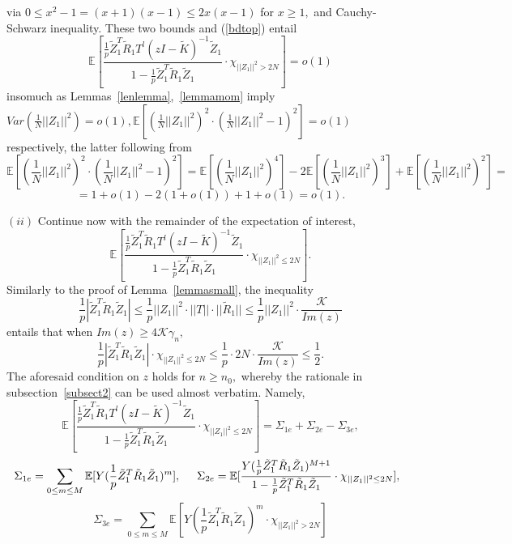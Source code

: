 \documentclass{article}
\numberwithin{equation}{section}
\begin{document}
via \(0 \leq x^2-1=(x+1)(x-1) \leq 2x(x-1)\) for \(x \geq 1,\) and Cauchy-Schwarz inequality. These two bounds and (\ref{bdtop}) entail
\begin{equation}\tag{\(E1e\)}\label{ext1}
    \mathbb{E}[\frac{\frac{1}{p}\tilde{Z}_1^T\tilde{R}_1T^l(zI-\tilde{K})^{-1}\tilde{Z}_1}{1-\frac{1}{p}\tilde{Z}_1^T\tilde{R}_1\tilde{Z}_1} \cdot \chi_{||Z_1||^2>2N}]=o(1)
\end{equation}
insomuch as Lemmas~\ref{lenlemma},~\ref{lemmamom} imply \(Var(\frac{1}{N}||Z_1||^2)=o(1),\mathbb{E}[(\frac{1}{N}||Z_1||^2)^2 \cdot (\frac{1}{N}||Z_1||^2-1)^2]=o(1)\) respectively, the latter following from
\[\mathbb{E}[(\frac{1}{N}||Z_1||^2)^2 \cdot (\frac{1}{N}||Z_1||^2-1)^2]=\mathbb{E}[(\frac{1}{N}||Z_1||^2)^4]-2\mathbb{E}[(\frac{1}{N}||Z_1||^2)^3]+\mathbb{E}[(\frac{1}{N}||Z_1||^2)^2]=\]
\[=1+o(1)-2(1+o(1))+1+o(1)=o(1).\]
\par
\((ii)\) Continue now with the remainder of the expectation of interest,
\[\mathbb{E}[\frac{\frac{1}{p}\tilde{Z}_1^T\tilde{R}_1T^l(zI-\tilde{K})^{-1}\tilde{Z}_1}{1-\frac{1}{p}\tilde{Z}_1^T\tilde{R}_1\tilde{Z}_1} \cdot \chi_{||Z_1||^2 \leq 2N}].\]
Similarly to the proof of Lemma~\ref{lemmasmall}, the inequality
\[\frac{1}{p}|\tilde{Z}_1^T\tilde{R}_1\tilde{Z}_1| \leq \frac{1}{p}||Z_1||^2 \cdot ||T|| \cdot ||\tilde{R}_1|| \leq \frac{1}{p}||Z_1||^2 \cdot \frac{\mathcal{K}}{Im(z)}\]
entails that when \(Im(z) \geq 4\mathcal{K}\gamma_n,\) 
\[\frac{1}{p}|\tilde{Z}_1^T\tilde{R}_1\tilde{Z}_1| \cdot \chi_{||Z_1||^2 \leq 2N} \leq \frac{1}{p} \cdot 2N \cdot \frac{\mathcal{K}}{Im(z)} \leq \frac{1}{2}.\]
The aforesaid condition on \(z\) holds for \(n \geq n_0,\) whereby the rationale in subsection~\ref{subsect2}
can be used almost verbatim. Namely,
\begin{equation}\tag{\(E2ae\)}\label{bulk1e}
    \mathbb{E}[\frac{\frac{1}{p}\tilde{Z}_1^T\tilde{R}_1T^l(zI-\tilde{K})^{-1}\tilde{Z}_1}{1-\frac{1}{p}\tilde{Z}_1^T\tilde{R}_1\tilde{Z}_1} \cdot \chi_{||Z_1||^2 \leq 2N}]=\Sigma_{1e}+\Sigma_{2e}-\Sigma_{3e},
\end{equation}
\[\Sigma_{1e}=\sum_{0 \leq m \leq M}{\mathbb{E}[Y(\frac{1}{p}\tilde{Z}_1^T\tilde{R}_1\tilde{Z}_1)^m]}, \hspace{0.5cm} \Sigma_{2e}=\mathbb{E}[\frac{Y(\frac{1}{p}\tilde{Z}_1^T\tilde{R}_1\tilde{Z}_1)^{M+1}}{1-\frac{1}{p}\tilde{Z}_1^T\tilde{R}_1\tilde{Z}_1} \cdot \chi_{||Z_1||^2 \leq 2N}], \hspace{0.2cm}\]
\[\Sigma_{3e}=\sum_{0 \leq m \leq M}{\mathbb{E}[Y(\frac{1}{p}\tilde{Z}_1^T\tilde{R}_1\tilde{Z}_1)^m\cdot \chi_{||Z_1||^2>2N}]}\]
\end{document}
